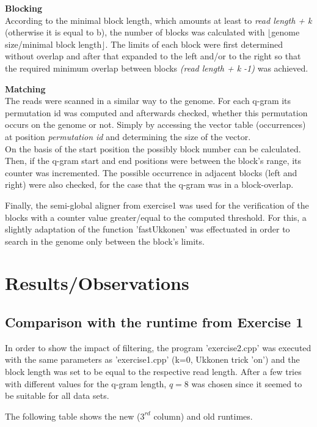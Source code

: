 \documentclass[11pt, notitlepage]{scrartcl}
\begin{document}
\textbf{Blocking}\\
According to the minimal block length, which amounts at least to \textit{read length + k} (otherwise it is equal to b), the number of blocks was calculated with $\lfloor$genome size/minimal block length$\rfloor$. The limits of each block were first determined without overlap and after that expanded to the left and/or to the right so that the required minimum overlap between blocks \textit{(read length + k -1)} was achieved.

\textbf{Matching}\\
The reads were scanned in a similar way to the genome. For each q-gram its permutation id was computed and afterwards checked, whether this permutation occurs on the genome or not. Simply by accessing the vector table (occurrences) at position \textit{permutation id} and determining the size of the vector.\\
On the basis of the start position the possibly block number can be calculated. Then, if the q-gram start and end positions were between the block's range, its counter was incremented. The possible occurrence in adjacent blocks (left and right) were also checked, for the case that the q-gram was in a block-overlap.

Finally, the semi-global aligner from exercise1 was used for the verification of the blocks with a counter value greater/equal to the computed threshold. For this, a slightly adaptation of the function 'fastUkkonen' was effectuated in order to search in the genome only between the block's limits. 

\section{Results/Observations}
\subsection*{Comparison with the runtime from Exercise 1}
In order to show the impact of filtering, the program 'exercise2.cpp' was executed with the same parameters as 'exercise1.cpp' (k=0, Ukkonen trick 'on') and the block length was set to be equal to the respective read length. After a few tries with different values for the q-gram length, $q=8$ was chosen since it seemed to be suitable for all data sets.

The following table shows the new  ($3^{rd}$ column) and old runtimes.
\end{document}
